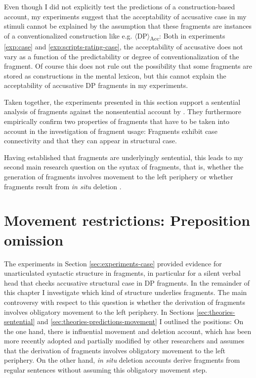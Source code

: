 Even though I did not explicitly test the predictions of a construction-based account, my experiments suggest that the acceptability of accusative case in my stimuli cannot be explained by the assumption that these fragments are instances of a conventionalized construction like e.g. $\langle$DP$\rangle$\textsubscript{Acc}: Both in experiments \ref{exp:case} and \ref{exp:scripts-rating-case}, the acceptability of accusative does not vary as a function of the predictability or degree of conventionalization of the fragment. Of course this does not rule out the possibility that some fragments are stored as constructions in the mental lexicon, but this cannot explain the acceptability of accusative DP fragments in my experiments.

Taken together, the experiments presented in this section support a sentential analysis of fragments against the nonsentential account by \citet{barton.progovac2005}. They furthermore empirically confirm two properties of fragments that have to be taken into account in the investigation of fragment usage: Fragments exhibit case connectivity and that they can appear in structural case.

Having established that fragments are underlyingly sentential, this leads to my second main research question on the syntax of fragments, that is, whether the generation of fragments involves movement to the left periphery \citep{merchant2004} or whether fragments result from \textit{in situ} deletion \citep{reich2007}.

\section{Movement restrictions: Preposition omission}
\label{sec:pstranding}

The experiments in Section \ref{sec:experiments-case} provided evidence for unarticulated syntactic structure in fragments, in particular for a silent verbal head that checks accusative structural case in DP fragments. In the remainder of this chapter I investigate which kind of structure underlies fragments. The main controversy with respect to this question is whether the derivation of fragments involves obligatory movement to the left periphery. In Sections \ref{sec:theories-sentential} and \ref{sec:theories-predictions-movement} I outlined the positions: On the one hand, there is  influential movement and deletion account, which has been more recently adopted and partially modified by other researchers \citep[see e.g.][]{aelbrecht2009, sato2011,weir2014, doring2016, saab.liptak2016,  murphy2018} and assumes that the derivation of fragments involves obligatory movement to the left periphery. On the other hand, \textit{in situ} deletion accounts \citep{reich2007, ott.struckmeier2016, griffiths.etal2018} derive fragments from regular sentences without assuming this obligatory movement step.

